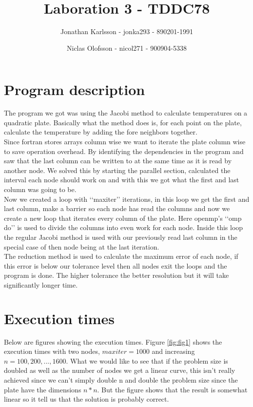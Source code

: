 \documentclass[a4paper]{article}
\author{Jonathan Karlsson - jonka293 - 890201-1991 \and Niclas Olofsson - nicol271 - 900904-5338}
\title{Laboration 3 - TDDC78}
\begin{document}
\maketitle

\section{Program description}
The program we got was using the Jacobi method to calculate temperatures on a quadratic plate. Basically what the method does is, for each point on the plate, calculate the temperature by adding the fore neighbors together.\\

Since fortran stores arrays column wise we want to iterate the plate column wise to save operation overhead. By identifying the dependencies in the program and saw that the last column can be written to at the same time as it is read by another node. We solved this by starting the parallel section, calculated  the interval each node should work on and with this we got what the first and last column was going to be.\\

Now we created a loop with \lq\lq{}maxiter\rq\rq{} iterations, in this loop we get the first and last column, make a barrier so each node has read the columns and now we create a new loop that iterates every column of the plate. Here openmp\rq{}s \lq\lq{}omp do\rq\rq{} is used to divide the columns into even work for each node. Inside this loop the regular Jacobi method is used with our previously read last column in the special case of then node being at the last iteration.\\

The reduction method is used to calculate the maximum error of each node, if this error is below our tolerance level then all nodes exit the loops and the program is done. The higher tolerance the better resolution but it will take significantly longer time.

\section{Execution times}
Below are figures showing the execution times. Figure \ref{fig:fig1} shows the execution times with two nodes, $maxiter = 1000$ and increasing $n = 100, 200, ..., 1600$. What we would like to see that if the problem size is doubled as well as the number of nodes we get a linear curve, this isn\rq{}t really achieved since we can\rq{}t simply double n and double the problem size since the plate have the dimensions $n * n$. But the figure shows that the result is somewhat linear so it tell us that the solution is probably correct.\\
\end{document}
